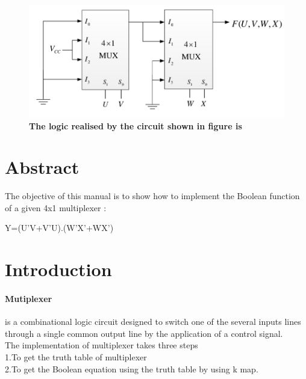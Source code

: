 \documentclass[10pt, a4paper]{article}
\title{\mytitle}
\author{\myauthor\hspace{1em}\\\contact\\FWC22098    IITH-Future Wireless Communications     Assignment-1\hspace{0.5em}\hspace{0.5em}\mymodule}
\date{}
\begin{document}
 \maketitle
     \tableofcontents 
    \begin{figure}
        \centering
        \includegraphics[width=\linewidth]{_mux.png}
        \caption{\textbf{The logic realised by the circuit shown in figure is}}
        \label{fig:my_label}
    \end{figure}
  \textbf{}{\mykeywords}
 \section{Abstract}
  \begin{ }
      The objective of this manual is to show how to implement the Boolean function of a given  4x1 multiplexer :
      
      \begin{center}
      Y=(U'V+V'U).(W'X'+WX')
      \end{center}

  \end{ }
\section{Introduction}
  
    \paragraph{Mutiplexer}
    is a combinational  logic circuit designed to switch one  of  the several  inputs lines through a single common output line by the application of a control signal.
      \\ The implementation of multiplexer takes three steps\\1.To get the truth table of multiplexer\\2.To get the Boolean equation using the truth table by using k map.\\
\end{document}
